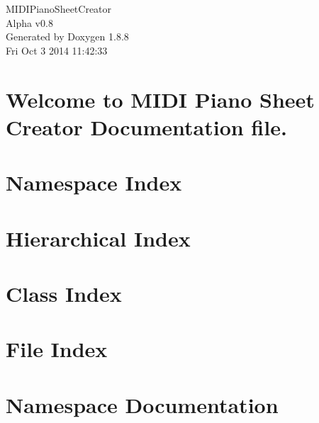 \documentclass[twoside]{book}
\newcommand{\+}{\discretionary{\mbox{\scriptsize$\hookleftarrow$}}{}{}}
\newcommand{\clearemptydoublepage}{%
  \newpage{\pagestyle{empty}\cleardoublepage}%
}
\begin{document}
\hypersetup{pageanchor=false,
             bookmarks=true,
             bookmarksnumbered=true,
             pdfencoding=unicode
            }
\begin{titlepage}
\vspace*{7cm}
\begin{center}%
{\Large M\+I\+D\+I\+Piano\+Sheet\+Creator \\[1ex]\large Alpha v0.\+8 }\\
\vspace*{1cm}
{\large Generated by Doxygen 1.8.8}\\
\vspace*{0.5cm}
{\small Fri Oct 3 2014 11:42:33}\\
\end{center}
\end{titlepage}
\clearemptydoublepage
\tableofcontents
\clearemptydoublepage
{}
\hypersetup{pageanchor=true}

\chapter{Welcome to M\+I\+D\+I Piano Sheet Creator Documentation file.}
\label{index}\hypertarget{index}{}
\chapter{Namespace Index}

\chapter{Hierarchical Index}

\chapter{Class Index}

\chapter{File Index}

\chapter{Namespace Documentation}






\end{document}
